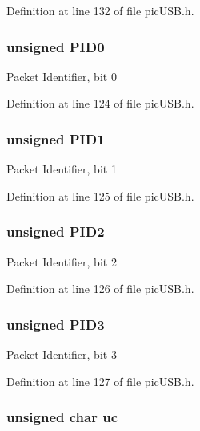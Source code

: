 Definition at line 132 of file pic\-U\-S\-B.\-h.

\hypertarget{union_b_d_stat_a810a2f6d15fc42c5d1e610b6e927d2eb}{
\subsubsection[{P\-I\-D0}]{\setlength{\rightskip}{0pt plus 5cm}unsigned P\-I\-D0}}\label{union_b_d_stat_a810a2f6d15fc42c5d1e610b6e927d2eb}
Packet Identifier, bit 0 

Definition at line 124 of file pic\-U\-S\-B.\-h.

\hypertarget{union_b_d_stat_acefd8c6eba334031c18cd877dfe08bfb}{
\subsubsection[{P\-I\-D1}]{\setlength{\rightskip}{0pt plus 5cm}unsigned P\-I\-D1}}\label{union_b_d_stat_acefd8c6eba334031c18cd877dfe08bfb}
Packet Identifier, bit 1 

Definition at line 125 of file pic\-U\-S\-B.\-h.

\hypertarget{union_b_d_stat_aef3d6a9445a3c61d870212360c0a6110}{
\subsubsection[{P\-I\-D2}]{\setlength{\rightskip}{0pt plus 5cm}unsigned P\-I\-D2}}\label{union_b_d_stat_aef3d6a9445a3c61d870212360c0a6110}
Packet Identifier, bit 2 

Definition at line 126 of file pic\-U\-S\-B.\-h.

\hypertarget{union_b_d_stat_a771971768126aebea428ac7194b17fc0}{
\subsubsection[{P\-I\-D3}]{\setlength{\rightskip}{0pt plus 5cm}unsigned P\-I\-D3}}\label{union_b_d_stat_a771971768126aebea428ac7194b17fc0}
Packet Identifier, bit 3 

Definition at line 127 of file pic\-U\-S\-B.\-h.

\hypertarget{union_b_d_stat_a4fb356afd2995f305b7124aeb0cb5152}{
\subsubsection[{uc}]{\setlength{\rightskip}{0pt plus 5cm}unsigned char uc}}\label{union_b_d_stat_a4fb356afd2995f305b7124aeb0cb5152}


